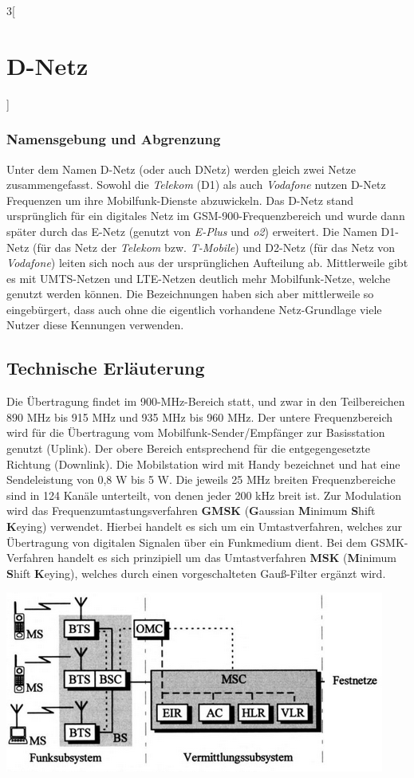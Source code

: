 \begin{multicols}{3}[\section{D-Netz}]
\subsubsection*{Namensgebung und Abgrenzung}
Unter dem Namen D-Netz (oder auch DNetz) werden gleich zwei Netze zusammengefasst. Sowohl die \textit{Telekom} (D1) als auch \textit{Vodafone} nutzen D-Netz Frequenzen um ihre Mobilfunk-Dienste abzuwickeln. Das D-Netz stand ursprünglich für ein digitales Netz im GSM-900-Frequenzbereich und wurde dann später durch das E-Netz (genutzt von \textit{E-Plus} und \textit{o2}) erweitert. Die Namen D1-Netz (für das Netz der \textit{Telekom} bzw. \textit{T-Mobile}) und D2-Netz (für das Netz von \textit{Vodafone}) leiten sich noch aus der ursprünglichen Aufteilung ab.
Mittlerweile gibt es mit UMTS-Netzen und LTE-Netzen deutlich mehr Mobilfunk-Netze, welche genutzt werden können. Die Bezeichnungen haben sich aber mittlerweile so eingebürgert, dass auch ohne die eigentlich vorhandene Netz-Grundlage viele Nutzer diese Kennungen verwenden.



\subsection*{Technische Erläuterung}
Die Übertragung findet im 900-MHz-Bereich statt, und zwar in den Teilbereichen 890 MHz bis 915 MHz und 935 MHz bis 960 MHz. Der untere Frequenzbereich wird für die Übertragung vom Mobilfunk-Sender/Empfänger zur Basisstation genutzt (Uplink). Der obere Bereich entsprechend für die entgegengesetzte Richtung (Downlink). Die Mobilstation wird mit Handy bezeichnet und hat eine Sendeleistung von 0,8 W bis 5 W. Die jeweils 25 MHz breiten Frequenzbereiche sind in 124 Kanäle unterteilt, von denen jeder 200 kHz breit ist. Zur Modulation wird das Frequenzumtastungsverfahren \textbf{GMSK} (\textbf{G}aussian \textbf{M}inimum \textbf{S}hift \textbf{K}eying) verwendet. Hierbei handelt es sich um ein Umtastverfahren, welches zur Übertragung von digitalen Signalen über ein Funkmedium dient. Bei dem GSMK-Verfahren handelt es sich prinzipiell um das Umtastverfahren \textbf{MSK} (\textbf{M}inimum \textbf{S}hift \textbf{K}eying), welches durch einen vorgeschalteten Gauß-Filter ergänzt wird. ~\cite{DNetz.7}     

\begin{Figure}
\includegraphics[width=\linewidth]{Kapitel/DNetz/Grafiken/systemaufbau.png}
\label{fig:DNetz.systemaufbau}
\end{Figure}


\end{multicols}
